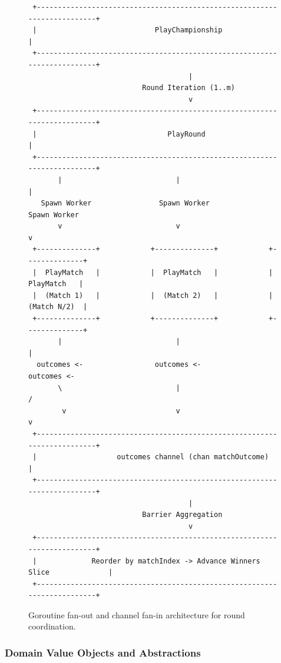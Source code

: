 \documentclass[11pt,a4paper]{article}
\begin{document}
\begin{figure}[h]
\centering
\begin{small}
\begin{verbatim}
 +-------------------------------------------------------------------------+
 |                            PlayChampionship                             |
 +-------------------------------------------------------------------------+
                                      |
                           Round Iteration (1..m)
                                      v
 +-------------------------------------------------------------------------+
 |                               PlayRound                                 |
 +-------------------------------------------------------------------------+
       |                           |                           |
   Spawn Worker                Spawn Worker                Spawn Worker
       v                           v                           v
 +--------------+            +--------------+            +--------------+
 |  PlayMatch   |            |  PlayMatch   |            |  PlayMatch   |
 |  (Match 1)   |            |  (Match 2)   |            | (Match N/2)  |
 +--------------+            +--------------+            +--------------+
       |                           |                           |
  outcomes <-                 outcomes <-                 outcomes <-
       \                           |                           /
        v                          v                          v
 +-------------------------------------------------------------------------+
 |                   outcomes channel (chan matchOutcome)                  |
 +-------------------------------------------------------------------------+
                                      |
                           Barrier Aggregation
                                      v
 +-------------------------------------------------------------------------+
 |             Reorder by matchIndex -> Advance Winners Slice              |
 +-------------------------------------------------------------------------+
\end{verbatim}
\end{small}
\caption{Goroutine fan-out and channel fan-in architecture for round coordination.}
\label{fig:hotc-arch}
\end{figure}

\subsubsection{Domain Value Objects and Abstractions}
\end{document}
